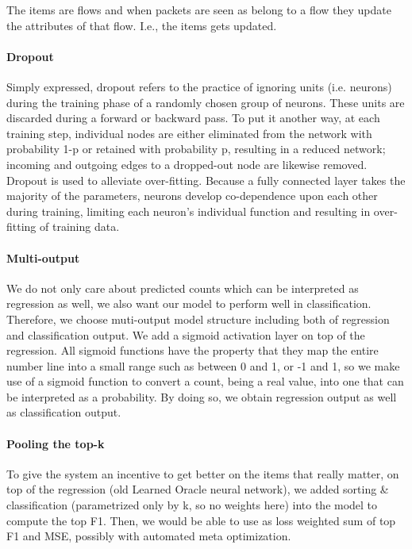 The items are flows and when packets are seen as belong to a flow they update the attributes of that flow. I.e., the items gets updated.

\paragraph{Dropout}
Simply expressed, dropout refers to the practice of ignoring units (i.e. neurons) during the training phase of a randomly chosen group of neurons. These units are discarded during a forward or backward pass.
To put it another way, at each training step, individual nodes are either eliminated from the network with probability 1-p or retained with probability p, resulting in a reduced network; incoming and outgoing edges to a dropped-out node are likewise removed. 
Dropout is used to alleviate over-fitting. Because a fully connected layer takes the majority of the parameters, neurons develop co-dependence upon each other during training, limiting each neuron's individual function and resulting in over-fitting of training data. 


\paragraph{Multi-output}
We do not only care about predicted counts which can be interpreted as regression as well, we also want our model to perform well in classification. Therefore, we choose muti-output model structure including both of regression and classification output. 
We add a sigmoid activation layer on top of the regression. All sigmoid functions have the property that they map the entire number line into a small range such as between 0 and 1, or -1 and 1, so we make use of a sigmoid function to convert a count, being a real value, into one that can be interpreted as a probability.
By doing so, we obtain regression output as well as classification output.

\paragraph{Pooling the top-k}
To give the system an incentive to get better on the items that really matter, on top of the regression (old Learned Oracle neural network), we added sorting \& classification  (parametrized only by k, so no weights here) into the model to compute the top F1. Then, we would be able to use as loss weighted sum of top F1 and MSE, possibly with automated meta optimization. 


